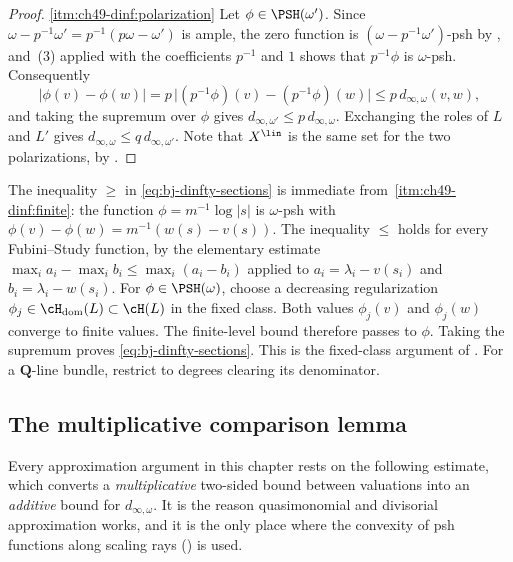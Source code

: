 \begin{proof}
\cref{itm:ch49-dinf:polarization}  Let $\phi\in\PSH(\omega')$.  Since
$\omega-p^{-1}\omega'=p^{-1}(p\omega-\omega')$ is ample, the zero
function is $(\omega-p^{-1}\omega')$-psh by
, and
\,(3) applied with the coefficients
$p^{-1}$ and $1$ shows that $p^{-1}\phi$ is $\omega$-psh.
Consequently
\[
 |\phi(v)-\phi(w)|
 =p\,\bigl|(p^{-1}\phi)(v)-(p^{-1}\phi)(w)\bigr|
 \le p\,d_{\infty,\omega}(v,w),
\]
and taking the supremum over $\phi$ gives
$d_{\infty,\omega'}\le p\,d_{\infty,\omega}$.  Exchanging the roles of
$L$ and $L'$ gives $d_{\infty,\omega}\le q\,d_{\infty,\omega'}$.
Note that $X^{\lin}$ is the same set for the two polarizations, by
.
\end{proof}

\begin{remark}
\label{rem:ch49-section-formula}
The inequality $\ge$ in \eqref{eq:bj-dinfty-sections} is immediate from
\,\cref{itm:ch49-dinf:finite}: the function
$\phi=m^{-1}\log|s|$ is $\omega$-psh with
$\phi(v)-\phi(w)=m^{-1}(w(s)-v(s))$.  The inequality $\le$ holds for
every Fubini--Study function, by the elementary estimate
$\max_ia_i-\max_ib_i\le\max_i(a_i-b_i)$ applied to
$a_i=\lambda_i-v(s_i)$ and $b_i=\lambda_i-w(s_i)$.  For $\phi\in\PSH(\omega)$, choose a decreasing regularization
$\phi_j\in\cH_{\mathrm{dom}}(L)\subset\cH(L)$ in the fixed class.
Both values $\phi_j(v)$ and $\phi_j(w)$ converge to finite values.
The finite-level bound therefore passes to $\phi$.  Taking the
supremum proves \eqref{eq:bj-dinfty-sections}.  This is the fixed-class
argument of \cite[Lemma~11.7 and Theorem~4.15]{BJ22}.
For a $\mathbf Q$-line bundle, restrict to degrees clearing its denominator.
\end{remark}

\subsection{The multiplicative comparison lemma}
\label{sec:ch49-comparison-lemma}

Every approximation argument in this chapter rests on the following
estimate, which converts a \emph{multiplicative} two-sided bound between
valuations into an \emph{additive} bound for $d_{\infty,\omega}$.  It is
the reason quasimonomial and divisorial approximation works, and it is the
only place where the convexity of psh functions along scaling rays
() is used.

